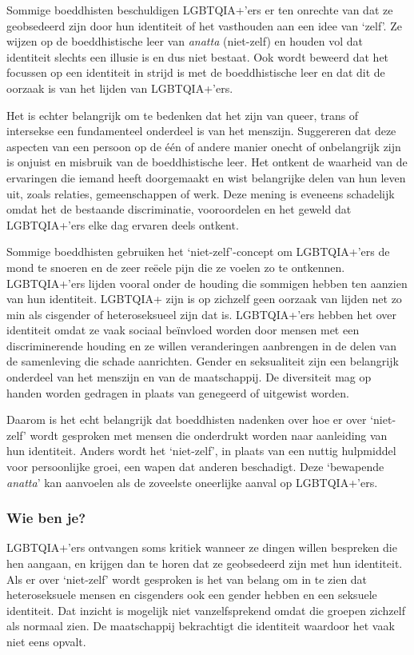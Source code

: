 \documentclass[12pt,openany]{book}
\begin{document}
Sommige boeddhisten beschuldigen LGBTQIA+’ers er ten onrechte van dat ze geobsedeerd zijn door hun identiteit of het vasthouden aan een idee van ‘zelf’. Ze wijzen op de boeddhistische leer van \textit{anatta} (niet-zelf) en houden vol dat identiteit slechts een illusie is en dus niet bestaat. Ook wordt beweerd dat het focussen op een identiteit in strijd is met de boeddhistische leer en dat dit de oorzaak is van het lijden van LGBTQIA+’ers. 

Het is echter belangrijk om te bedenken dat het zijn van queer, trans of intersekse een fundamenteel onderdeel is van het menszijn. Suggereren dat deze aspecten van een persoon op de één of andere manier onecht of onbelangrijk zijn is onjuist en misbruik van de boeddhistische leer. Het ontkent de waarheid van de ervaringen die iemand heeft doorgemaakt en wist belangrijke delen van hun leven uit, zoals relaties, gemeenschappen of werk. Deze mening is eveneens schadelijk omdat het de bestaande discriminatie, vooroordelen en het geweld dat LGBTQIA+’ers elke dag ervaren deels ontkent. 

Sommige boeddhisten gebruiken het ‘niet-zelf’-concept om LGBTQIA+’ers de mond te snoeren en de zeer reëele pijn die ze voelen zo te ontkennen. LGBTQIA+’ers lijden vooral onder de houding die sommigen hebben ten aanzien van hun identiteit. LGBTQIA+ zijn is op zichzelf geen oorzaak van lijden net zo min als cisgender of heteroseksueel zijn dat is. LGBTQIA+’ers hebben het over identiteit omdat ze vaak sociaal beïnvloed worden door mensen met een discriminerende houding en ze willen veranderingen aanbrengen in de delen van de samenleving die schade aanrichten. Gender en seksualiteit zijn een belangrijk onderdeel van het menszijn en van de maatschappij. De diversiteit mag op handen worden gedragen in plaats van genegeerd of uitgewist worden. 

Daarom is het echt belangrijk dat boeddhisten nadenken over hoe er over ‘niet-zelf’ wordt gesproken met mensen die onderdrukt worden naar aanleiding van hun identiteit. Anders wordt het ‘niet-zelf’, in plaats van een nuttig hulpmiddel voor persoonlijke groei, een wapen dat anderen beschadigt. Deze ‘bewapende \textit{anatta}’ kan aanvoelen als de zoveelste oneerlijke aanval op LGBTQIA+’ers.  

\subsubsection*{Wie ben je?}

LGBTQIA+’ers ontvangen soms kritiek wanneer ze dingen willen bespreken die hen aangaan, en krijgen dan te horen dat ze geobsedeerd zijn met hun identiteit. Als er over ‘niet-zelf’ wordt gesproken is het van belang om in te zien dat heteroseksuele mensen en cisgenders ook een gender hebben en een seksuele identiteit. Dat inzicht is mogelijk niet vanzelfsprekend omdat die groepen zichzelf als normaal zien. De maatschappij bekrachtigt die identiteit waardoor het vaak niet eens opvalt.
\end{document}
